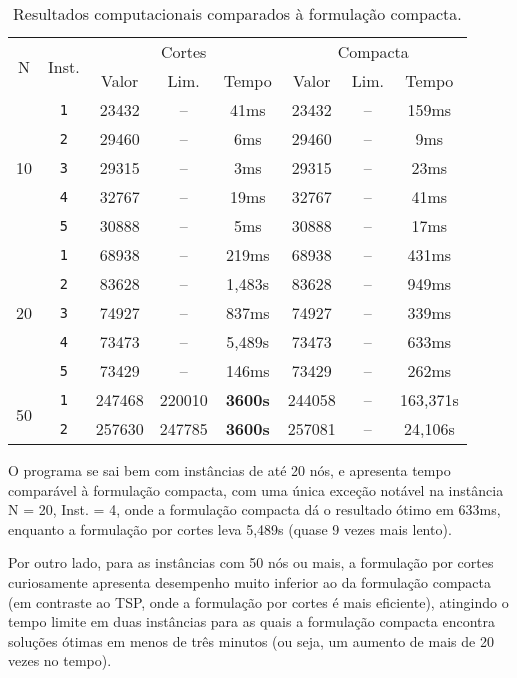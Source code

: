 \documentclass{article}
\begin{document}
\begin{table}[ht]
    \centering
    \begin{tabular}{c|c|c|c|c|c|c|c}
        \hline
        \multirow{2}{0.6cm}{N}&\multirow{2}{1cm}{Inst.} & \multicolumn{3}{c|}{Cortes} & \multicolumn{3}{c}{Compacta}\\
        \cline{3-8}
        &&Valor & Lim. & Tempo & Valor & Lim. & Tempo \\
        \hline\hline

        \multirow{5}{0.6cm}{10}
        &{\tt 1} & 23432 & -- & 41ms & 23432 & -- & 159ms \\
        &{\tt 2} & 29460 & -- & 6ms & 29460 & -- & 9ms \\
        &{\tt 3} & 29315 & -- & 3ms & 29315 & -- & 23ms \\
        &{\tt 4} & 32767 & -- & 19ms & 32767 & -- & 41ms \\
        &{\tt 5} & 30888 & -- & 5ms & 30888 & -- & 17ms \\

        \hline\multirow{5}{0.6cm}{20}
        &{\tt 1} & 68938 & -- & 219ms & 68938 & -- & 431ms \\
        &{\tt 2} & 83628 & -- & 1,483s & 83628 & -- & 949ms \\
        &{\tt 3} & 74927 & -- & 837ms & 74927 & -- & 339ms \\
        &{\tt 4} & 73473 & -- & 5,489s & 73473 & -- & 633ms \\
        &{\tt 5} & 73429 & -- & 146ms & 73429 & -- & 262ms \\

        \hline\multirow{2}{0.6cm}{50}
        &{\tt 1} & 247468 & 220010 & {\bf 3600s} & 244058 & -- & 163,371s\\
        &{\tt 2} & 257630 & 247785 & {\bf 3600s} & 257081 & -- & 24,106s
    \end{tabular}
    \caption{Resultados computacionais comparados à formulação compacta.}
    \label{tab:comparative-results}
\end{table}

O programa se sai bem com instâncias de até 20 nós, e apresenta tempo comparável à formulação compacta, com uma única exceção notável na instância N = 20, Inst. = 4, onde a formulação compacta dá o resultado ótimo em 633ms, enquanto a formulação por cortes leva 5,489s (quase 9 vezes mais lento).

Por outro lado, para as instâncias com 50 nós ou mais, a formulação por cortes curiosamente apresenta desempenho muito inferior ao da formulação compacta (em contraste ao TSP, onde a formulação por cortes é mais eficiente), atingindo o tempo limite em duas instâncias para as quais a formulação compacta encontra soluções ótimas em menos de três minutos (ou seja, um aumento de mais de 20 vezes no tempo).
\end{document}
